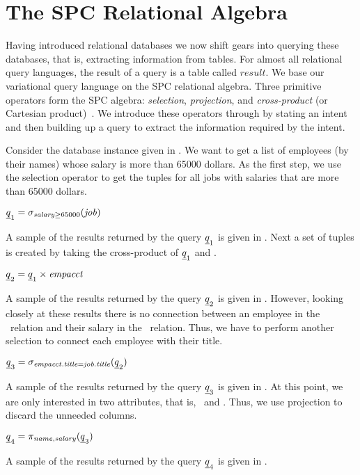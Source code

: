 \section{The SPC Relational Algebra}
\label{sec:ra}

Having introduced relational databases we now shift gears into querying
these databases, that is, extracting information from tables.
For almost all relational query languages, the result of a query 
is a table called $\mathit{result}$. 
%
We base our variational query language on the SPC relational algebra.
Three primitive operators form the SPC algebra: \emph{selection}, \emph{projection},
and \emph{cross-product} (or Cartesian product)~\cite{AliceBook}.
We introduce these operators through  by stating an intent and then
building up a query to extract the information required by the intent. 

\begin{example}
\label{eg:ra}
Consider the database instance given in . We want to get a list
of employees (by their names) whose salary is more than 65000 dollars. 
As the first step, we use the selection operator to get the tuples for all jobs with salaries that 
are more than 65000 dollars.\\
%
\centerline{
\ensuremath{
{\pQ_1} = \sigma_{\salary \ge 65000} (\job)
}}
%
\noindent
A sample of the results returned by the query ${\pQ_1}$ is given in .
Next a set of 
 tuples is created by taking the cross-product of ${\pQ_1}$
and \empacct.\\
%
\centerline{
\ensuremath{
{\pQ_2} = {\pQ_1} \times \empacct
}}
%
\noindent
A sample of the results returned by the query ${\pQ_2}$ is given in .
However, looking closely at these results there is no connection between an employee
in the \empacct\ relation and their salary in the \job\ relation. Thus, we have to perform 
another selection to connect each employee with their title. \\
%
\centerline{
\ensuremath{
{\pQ_3} = \sigma_{\empacct.\titleatt=\job.\titleatt} ({\pQ_2})
}}
%
\noindent
A sample of the results returned by the query ${\pQ_3}$ is given in .
At this point, we are only interested in two attributes, that is, \name\ and \salary.
Thus, we use projection to discard the unneeded columns.\\
%
\centerline{
\ensuremath{
{\pQ_4} = \pi_{\name, \salary} ({\pQ_3} )
}}
%
A sample of the results returned by the query ${\pQ_4}$ is given in .
\end{example}

